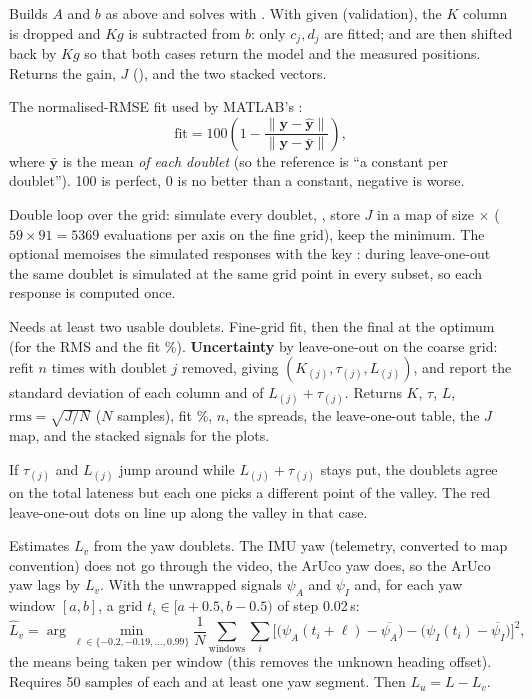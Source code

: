 Builds $A$ and $b$ as above and solves with . With  given (validation), the
$K$ column is dropped and $K g$ is subtracted from $b$: only $c_j, d_j$ are fitted;  and 
are then shifted back by $Kg$ so that both cases return the model and the measured positions. Returns the gain,
$J$ (), and the two stacked vectors.

The normalised-RMSE fit used by MATLAB's :
$$
\text{fit} = 100\left(1 - \frac{\lVert \mathbf y - \hat{\mathbf y}\rVert}{\lVert \mathbf y - \bar{\mathbf y}\rVert}\right),
$$
where $\bar{\mathbf y}$ is the mean \emph{of each doublet} (so the reference is ``a constant per doublet'').
100 is perfect, 0 is no better than a constant, negative is worse.

Double loop over the grid: simulate every doublet, , store $J$ in a map of size
 $\times$  ($59 \times 91 = 5369$ evaluations per axis on the fine grid), keep the
minimum. The optional  memoises the simulated responses with the key
: during leave-one-out the same doublet is simulated at the same grid point in
every subset, so each response is computed once.

Needs at least two usable doublets. Fine-grid fit, then the final  at the optimum (for the RMS and the
fit \%). \textbf{Uncertainty} by leave-one-out on the coarse grid: refit $n$ times with doublet $j$ removed,
giving $(K_{(j)}, \tau_{(j)}, L_{(j)})$, and report the standard deviation of each column and of
$L_{(j)}+\tau_{(j)}$. Returns $K$, $\tau$, $L$, $\text{rms} = \sqrt{J/N}$ ($N$ samples), fit \%, $n$, the spreads,
the leave-one-out table, the $J$ map, and the stacked signals for the plots.

\begin{intuition}
If $\tau_{(j)}$ and $L_{(j)}$ jump around while $L_{(j)}+\tau_{(j)}$ stays put, the doublets agree on the
total lateness but each one picks a different point of the valley. The red leave-one-out dots on
 line up along the valley in that case.
\end{intuition}

Estimates $L_v$ from the yaw doublets. The IMU yaw (telemetry, converted to map convention) does not go through
the video, the ArUco yaw does, so the ArUco yaw lags by $L_v$. With the unwrapped signals $\psi_A$ and $\psi_I$
and, for each yaw window $[a, b]$, a grid $t_i \in [a+0.5, b-0.5)$ of step 0.02\,s:
$$
\hat L_v = \arg\min_{\ell \in \lbrace -0.2, -0.19, \dots, 0.99\rbrace}
\frac{1}{N}\sum_{\text{windows}}\sum_i \Big[\big(\psi_A(t_i+\ell) - \overline{\psi_A}\big) - \big(\psi_I(t_i) - \overline{\psi_I}\big)\Big]^2 ,
$$
the means being taken per window (this removes the unknown heading offset). Requires 50 samples of each and at
least one yaw segment. Then $L_u = L - L_v$.

